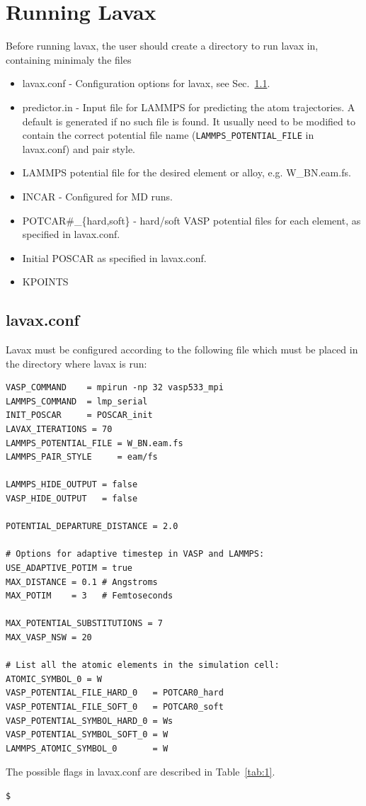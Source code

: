 \documentclass{article}
\begin{document}
\section{Running Lavax}
Before running lavax, the user should create a directory to run lavax in, containing minimaly the files
\begin{itemize}
\item lavax.conf - Configuration options for lavax, see Sec.~\ref{sec:lavax_conf}.
\item predictor.in - Input file for LAMMPS for predicting the atom trajectories. A default is generated if no such file is found. It usually need to be modified to contain the correct potential file name (\texttt{LAMMPS\_POTENTIAL\_FILE} in lavax.conf) and pair style.
\item LAMMPS potential file for the desired element or alloy, e.g. W\_BN.eam.fs.
\item INCAR - Configured for MD runs.
\item POTCAR\#\_\{hard,soft\} - hard/soft VASP potential files for each element, as specified in lavax.conf.
\item Initial POSCAR as specified in lavax.conf.
\item KPOINTS
\end{itemize}

\newpage
\subsection{lavax.conf}
\label{sec:lavax_conf}
Lavax must be configured according to the following file which must be placed in the directory where lavax is run:
\begin{verbatim}
VASP_COMMAND    = mpirun -np 32 vasp533_mpi
LAMMPS_COMMAND  = lmp_serial
INIT_POSCAR     = POSCAR_init
LAVAX_ITERATIONS = 70
LAMMPS_POTENTIAL_FILE = W_BN.eam.fs
LAMMPS_PAIR_STYLE     = eam/fs

LAMMPS_HIDE_OUTPUT = false
VASP_HIDE_OUTPUT   = false

POTENTIAL_DEPARTURE_DISTANCE = 2.0

# Options for adaptive timestep in VASP and LAMMPS:
USE_ADAPTIVE_POTIM = true
MAX_DISTANCE = 0.1 # Angstroms
MAX_POTIM    = 3   # Femtoseconds

MAX_POTENTIAL_SUBSTITUTIONS = 7
MAX_VASP_NSW = 20

# List all the atomic elements in the simulation cell:
ATOMIC_SYMBOL_0 = W
VASP_POTENTIAL_FILE_HARD_0   = POTCAR0_hard
VASP_POTENTIAL_FILE_SOFT_0   = POTCAR0_soft
VASP_POTENTIAL_SYMBOL_HARD_0 = Ws
VASP_POTENTIAL_SYMBOL_SOFT_0 = W
LAMMPS_ATOMIC_SYMBOL_0       = W
\end{verbatim}
The possible flags in lavax.conf are described in Table~\ref{tab:1}.
\begin{verbatim}
$
\end{verbatim}
\end{document}
